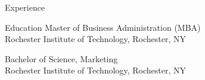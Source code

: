 \documentclass{resume}
\begin{document}
\begin{rSection}{Experience}

\end{rSection}
\vspace{-0.15cm}


\begin{rSection}{Education}
{Master of Business Administration (MBA)} \hfill {\textcolor{black!60}{}}\\
{Rochester Institute of Technology}, Rochester, NY

{Bachelor of Science, Marketing} \hfill {\textcolor{black!60}{}}\\
{Rochester Institute of Technology}, Rochester, NY
\end{rSection}
\vspace{-0.15cm}

\end{document}
